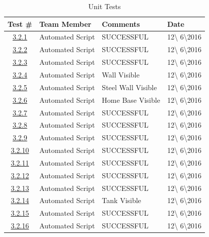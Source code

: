 \documentclass{article}
\begin{document}
\begin{table}[H]
\caption{Unit Tests}
	\begin{tabularx}{\textwidth}{| c | l | X | l |}
	\toprule
	Test \#& Team Member &Comments &Date\\
	\midrule
	\hyperref[sec:3.2.1]{3.2.1}& Automated Script  & SUCCESSFUL & 12\textbackslash
	6\textbackslash2016\\
	\hyperref[sec:3.2.2]{3.2.2}& Automated Script  & SUCCESSFUL & 12\textbackslash
	6\textbackslash2016\\
	\hyperref[sec:3.2.3]{3.2.3}& Automated Script  & SUCCESSFUL & 12\textbackslash
	6\textbackslash2016\\
	\hyperref[sec:3.2.4]{3.2.4}& Automated Script  & Wall Visible & 12\textbackslash
	6\textbackslash2016\\
	\hyperref[sec:3.2.5]{3.2.5}& Automated Script  & Steel Wall Visible & 12\textbackslash
	6\textbackslash2016\\
	\hyperref[sec:3.2.6]{3.2.6}& Automated Script  & Home Base Visible & 12\textbackslash
	6\textbackslash2016\\
	\hyperref[sec:3.2.7]{3.2.7}& Automated Script  & SUCCESSFUL & 12\textbackslash
	6\textbackslash2016\\
	\hyperref[sec:3.2.8]{3.2.8}& Automated Script  & SUCCESSFUL & 12\textbackslash
	6\textbackslash2016\\
	\hyperref[sec:3.2.9]{3.2.9}& Automated Script  & SUCCESSFUL & 12\textbackslash
	6\textbackslash2016\\
	\hyperref[sec:3.2.10]{3.2.10}& Automated Script  & SUCCESSFUL & 12\textbackslash
	6\textbackslash2016\\
	\hyperref[sec:3.2.11]{3.2.11}& Automated Script  & SUCCESSFUL & 12\textbackslash
	6\textbackslash2016\\
	\hyperref[sec:3.2.12]{3.2.12}& Automated Script  & SUCCESSFUL & 12\textbackslash
	6\textbackslash2016\\
	\hyperref[sec:3.2.13]{3.2.13}& Automated Script  & SUCCESSFUL & 12\textbackslash
	6\textbackslash2016\\
	\hyperref[sec:3.2.14]{3.2.14}& Automated Script  & Tank Visible & 12\textbackslash
	6\textbackslash2016\\
	\hyperref[sec:3.2.15]{3.2.15}& Automated Script  & SUCCESSFUL & 12\textbackslash
	6\textbackslash2016\\
	\hyperref[sec:3.2.16]{3.2.16}& Automated Script  & SUCCESSFUL & 12\textbackslash
	6\textbackslash2016\\
	
		\bottomrule
	\end{tabularx}
\end{table}
\end{document}
